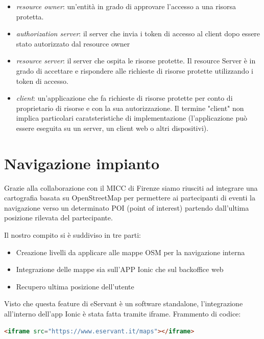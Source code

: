 \begin{itemize}
\item \textit{resource owner}: un'entità in grado di approvare l'accesso a una risorsa protetta.
\item \textit{authorization server}: il server che invia i token di accesso al client dopo essere stato autorizzato
dal resource owner
\item \textit{resource server}: il server che ospita le risorse protette. Il resource Server è in grado di accettare
e rispondere alle richieste di risorse protette utilizzando i token di accesso.
\item \textit{client}: un'applicazione che fa richieste di risorse protette per conto di
proprietario di risorse e con la sua autorizzazione. Il termine "client"
non implica particolari caratsteristiche di implementazione (l'applicazione può essere eseguita
su un server, un client web o altri dispositivi).
\end{itemize}


\section{Navigazione impianto}
Grazie alla collaborazione con il MICC di Firenze siamo riusciti ad integrare una cartografia basata su OpenStreetMap
per permettere ai partecipanti di eventi la navigazione verso un determinato POI (point of interest) partendo
dall'ultima posizione rilevata del partecipante.

Il nostro compito si è suddiviso in tre parti:
\begin{itemize}
\item Creazione livelli da applicare alle mappe OSM per la navigazione interna
\item Integrazione delle mappe sia sull'APP Ionic che sul backoffice web
\item Recupero ultima posizione dell'utente
\end{itemize}

Visto che questa feature di eServant è un software standalone, l'integrazione all'interno dell'app Ionic è stata fatta
tramite iframe.
Frammento di codice:
\begin{lstlisting}[language=html]
<iframe src="https://www.eservant.it/maps"></iframe>
\end{lstlisting}

\paragraph{}

